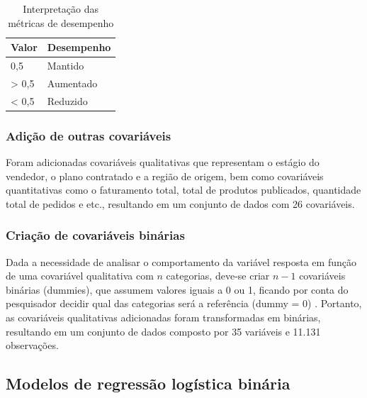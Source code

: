 \documentclass[twocolumn]{rbef}
\newcommand{\1}{\mathbbm{1}}
\begin{document}
\begin{table}

\caption{\label{tab:metricas}Interpretação das métricas de desempenho}
\centering
\fontsize{9}{11}\selectfont
\begin{tabular}[t]{ll}
\toprule
Valor & Desempenho\\
\midrule
0,5 & Mantido\\
> 0,5 & Aumentado\\
< 0,5 & Reduzido\\
\bottomrule
\end{tabular}
\end{table}

\hypertarget{adiuxe7uxe3o-de-outras-covariuxe1veis}{%
\subsubsection{Adição de outras covariáveis}\label{adiuxe7uxe3o-de-outras-covariuxe1veis}}

Foram adicionadas covariáveis qualitativas que representam o estágio do vendedor, o plano contratado e a região de origem, bem como covariáveis quantitativas como o faturamento total, total de produtos publicados, quantidade total de pedidos e etc., resultando em um conjunto de dados com 26 covariáveis.

\hypertarget{criauxe7uxe3o-de-covariuxe1veis-binuxe1rias}{%
\subsubsection{Criação de covariáveis binárias}\label{criauxe7uxe3o-de-covariuxe1veis-binuxe1rias}}

Dada a necessidade de analisar o comportamento da variável resposta em função de uma covariável qualitativa com \(n\) categorias, deve-se criar \(n-1\) covariáveis binárias (dummies), que assumem valores iguais a 0 ou 1, ficando por conta do pesquisador decidir qual das categorias será a referência (dummy = 0) \cite{Favero2017}. Portanto, as covariáveis qualitativas adicionadas foram transformadas em binárias, resultando em um conjunto de dados composto por 35 variáveis e 11.131 observações.

\hypertarget{modelos-de-regressuxe3o-loguxedstica-binuxe1ria}{%
\subsection{Modelos de regressão logística binária}\label{modelos-de-regressuxe3o-loguxedstica-binuxe1ria}}
\end{document}
